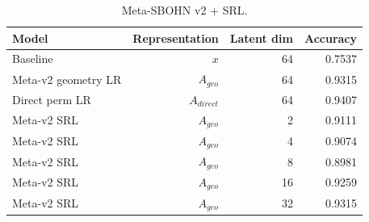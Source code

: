 \begin{table}[h]
\centering
\caption{Meta-SBOHN v2 + SRL.}
\begin{tabular}{l r r r}
\hline
Model & Representation & Latent dim & Accuracy \\
\hline
Baseline & \(x\) & 64 & 0.7537 \\
Meta-v2 geometry LR & \(A_{geo}\) & 64 & 0.9315 \\
Direct perm LR & \(A_{direct}\) & 64 & 0.9407 \\
Meta-v2 SRL & \(A_{geo}\) & 2 & 0.9111 \\
Meta-v2 SRL & \(A_{geo}\) & 4 & 0.9074 \\
Meta-v2 SRL & \(A_{geo}\) & 8 & 0.8981 \\
Meta-v2 SRL & \(A_{geo}\) & 16 & 0.9259 \\
Meta-v2 SRL & \(A_{geo}\) & 32 & 0.9315 \\
\hline
\end{tabular}
\end{table}
